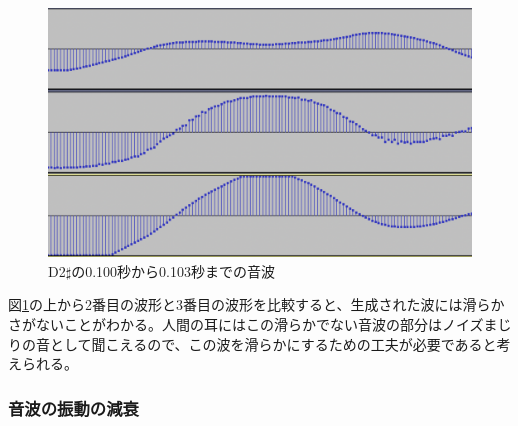 \begin{figure}[t]
\begin{center}
\includegraphics[width=0.7\hsize]{figure/88_88_det/d2s_0100_0103.png}
\caption{D2$\sharp$の0.100秒から0.103秒までの音波}
\label{fig:88_88_smooth}
\end{center}
\end{figure}

図\ref{fig:88_88_smooth}の上から2番目の波形と3番目の波形を比較すると、生成された波には滑らかさがないことがわかる。人間の耳にはこの滑らかでない音波の部分はノイズまじりの音として聞こえるので、この波を滑らかにするための工夫が必要であると考えられる。

\subsubsection{音波の振動の減衰}

